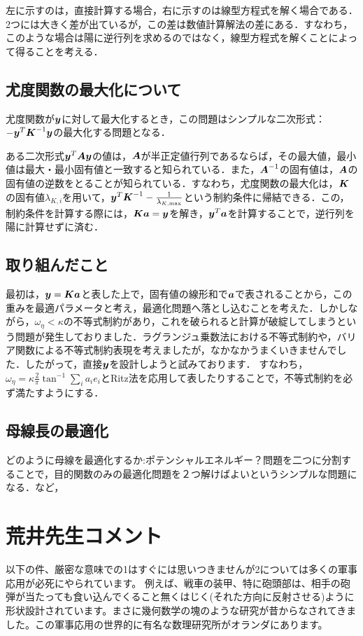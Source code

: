\documentclass[11pt]{jsarticle}
\begin{document}
			左に示すのは，直接計算する場合，右に示すのは線型方程式を解く場合である．2つには大きく差が出ているが，この差は数値計算解法の差にある．すなわち，このような場合は陽に逆行列を求めるのではなく，線型方程式を解くことによって得ることを考える．
		\subsection{尤度関数の最大化について}
			尤度関数が$ \boldsymbol{y} $に対して最大化するとき，この問題はシンプルな二次形式：$ -\boldsymbol{y}^T \boldsymbol{K}^{-1} \boldsymbol{y} $の最大化する問題となる．
			
			ある二次形式$ \boldsymbol{y}^T \boldsymbol{A} \boldsymbol{y}$の値は，$ \boldsymbol{A} $が半正定値行列であるならば，その最大値，最小値は最大・最小固有値と一致すると知られている．また，$ \boldsymbol{A}^{-1} $の固有値は，$ \boldsymbol{A} $の固有値の逆数をとることが知られている．すなわち，尤度関数の最大化は，$ \boldsymbol{K} $の固有値$ \lambda_{K,i} $を用いて，$ \boldsymbol{y}^T \boldsymbol{K}^{-1} - \frac{1}{\lambda_{K,\max}} $という制約条件に帰結できる．この，制約条件を計算する際には，$ \boldsymbol{K} \boldsymbol{a} = \boldsymbol{y} $を解き，$ \boldsymbol{y}^T \boldsymbol{a} $を計算することで，逆行列を陽に計算せずに済む．
			
		\subsection{取り組んだこと}
			最初は，$ \boldsymbol{y} = \boldsymbol{K} \boldsymbol{a}$と表した上で，固有値の線形和で$ \boldsymbol{a} $で表されることから，この重みを最適パラメータと考え，最適化問題へ落とし込むことを考えた．しかしながら，$ \omega_{\eta} <\kappa$の不等式制約があり，これを破られると計算が破綻してしまうという問題が発生しておりました．ラグランジュ乗数法における不等式制約や，バリア関数による不等式制約表現を考えましたが，なかなかうまくいきませんでした．したがって，直接$ \boldsymbol{y} $を設計しようと試みております．
			すなわち，$\omega_{\eta} = \kappa \frac{2}{\pi} \tan^{-1} \sum_i a_i e_i $とRitz法を応用して表したりすることで，不等式制約を必ず満たすようにする．
		\subsection{母線長の最適化}
			どのように母線を最適化するか:ポテンシャルエネルギー？問題を二つに分割することで，目的関数のみの最適化問題を２つ解けばよいというシンプルな問題になる．など，
	\section{荒井先生コメント}
		以下の件、厳密な意味での1はすぐには思いつきませんが2については多くの軍事応用が必死にやられています。
		例えば、戦車の装甲、特に砲頭部は、相手の砲弾が当たっても食い込んでくること無くはじく(それた方向に反射させる)ように形状設計されています。まさに幾何数学の塊のような研究が昔からなされてきました。この軍事応用の世界的に有名な数理研究所がオランダにあります。
		
\end{document}
